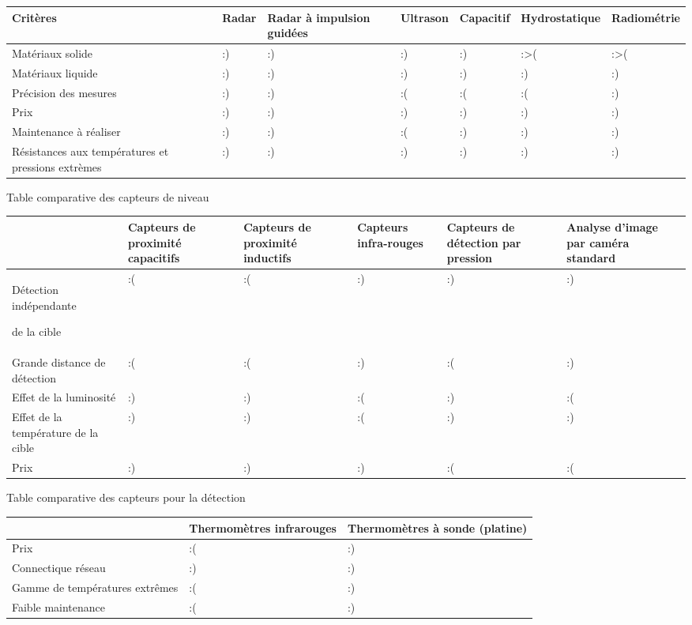 \documentclass{mise_en_page}
\begin{document}
\begin{flushleft}
\tablehead{}
\begin{supertabular}{|m{2.71cm}|m{1.308cm}|m{2.155cm}|m{1.8109999cm}|m{1.8369999cm}|m{2.816cm}|m{2.508cm}|}
\hline
Critères &
Radar &
Radar à impulsion guidées &
Ultrason &
Capacitif &
Hydrostatique &
Radiométrie\\\hline
Matériaux solide &
:) &
:) &
:) &
:) &
:{\textgreater}( &
:{\textgreater}(\\\hline
Matériaux liquide &
:) &
:) &
:) &
:) &
:) &
:)\\\hline
Précision des mesures &
:) &
:) &
:( &
:( &
:( &
:)\\\hline
Prix &
:) &
:) &
:) &
:) &
:) &
:)\\\hline
Maintenance à réaliser &
:) &
:) &
:( &
:) &
:) &
:)\\\hline
Résistances aux températures et pressions extrèmes &
:) &
:) &
:) &
:) &
:) &
:)\\\hline
\end{supertabular}
\end{flushleft}

Table comparative des capteurs de niveau

\begin{flushleft}
\tablehead{}
\begin{supertabular}{|m{2.843cm}|m{2.261cm}|m{2.552cm}|m{2.552cm}|m{2.552cm}|m{2.587cm}|}
\hline
~
 &
Capteurs de proximité capacitifs &
Capteurs de proximité inductifs &
Capteurs infra-rouges &
Capteurs de détection par pression &
Analyse d’image par caméra standard\\\hline
Détection indépendante 

 de la cible &
:( &
:( &
:) &
:) &
:)\\\hline
Grande distance de détection  &
:( &
:( &
:) &
:( &
:)\\\hline
Effet de la luminosité &
:) &
:) &
:( &
:) &
:(\\\hline
Effet de la température de la cible &
:) &
:) &
:( &
:) &
:)\\\hline
Prix &
:) &
:) &
:) &
:( &
:(\\\hline
\end{supertabular}
\end{flushleft}

Table comparative des capteurs pour la détection

\begin{flushleft}
\tablehead{}
\begin{supertabular}{|m{5.303cm}|m{5.303cm}|m{5.339cm}|}
\hline
~
 &
Thermomètres infrarouges &
Thermomètres à sonde (platine)\\\hline
Prix &
:( &
:)\\\hline
Connectique réseau &
:) &
:)\\\hline
Gamme de températures extrêmes &
:( &
:)\\\hline
Faible maintenance &
:( &
:)\\\hline
\end{supertabular}
\end{flushleft}
\end{document}
